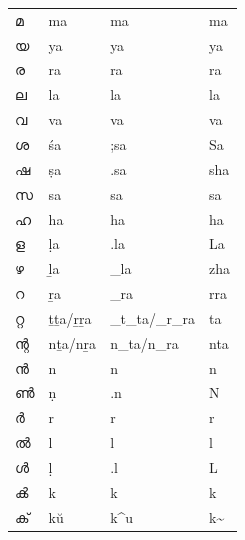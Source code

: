 \documentclass[a4paper]{article}
\begin{document}
\begin{longtable}[l]{p{2.3cm} p{2.3cm} p{2.3cm} p{2.3cm}}
മ & ma & ma & ma \\
യ & ya & ya & ya \\
ര & ra & ra & ra \\
ല & la & la & la \\
വ & va & va & va \\
ശ & śa & ;sa & Sa \\
ഷ & ṣa & .sa & sha \\
സ & sa & sa & sa \\
ഹ & ha & ha & ha \\
ള & ḷa & .la & La \\
ഴ & ḻa & \_la & zha \\
റ & ṟa & \_ra & rra \\
റ്റ & ṯṯa/ṟṟa & \_t\_ta/\_r\_ra & ta \\
ന്റ & nṯa/nṟa & n\_ta/n\_ra & nta \\
ൻ & n & n & n \\
ൺ & ṇ & .n & N \\
ർ & r & r & r \\
ൽ & l & l & l \\
ൾ & ḷ & .l & L \\
ൿ & k & k & k \\
ക് & kŭ & k\^{}u & k\textasciitilde \\
\end{longtable}
\end{document}
